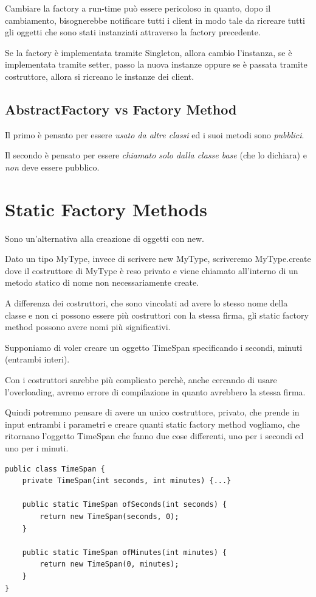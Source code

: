 Cambiare la factory a run-time può essere pericoloso in quanto, dopo il cambiamento, bisognerebbe notificare tutti i client in modo tale da ricreare tutti gli oggetti 
che sono stati instanziati attraverso la factory precedente.

Se la factory è implementata tramite Singleton, allora cambio l'instanza, se è implementata tramite setter, passo la nuova instanze oppure se è passata tramite 
costruttore, allora si ricreano le instanze dei client.

\subsection{AbstractFactory vs Factory Method}

Il primo è pensato per essere \textit{usato da altre classi} ed i suoi metodi sono \textit{pubblici}.

Il secondo è pensato per essere \textit{chiamato solo dalla classe base} (che lo dichiara) e \textit{non} deve essere pubblico.

\section{Static Factory Methods}

Sono un'alternativa alla creazione di oggetti con new.

Dato un tipo MyType, invece di scrivere new MyType, scriveremo MyType.create dove il costruttore di MyType è reso privato e viene chiamato all'interno di un metodo 
statico di nome non necessariamente create.

A differenza dei costruttori, che sono vincolati ad avere lo stesso nome della classe e non ci possono essere più costruttori con la stessa firma, gli static factory 
method possono avere nomi più significativi.

Supponiamo di voler creare un oggetto TimeSpan specificando i secondi, minuti (entrambi interi).

Con i costruttori sarebbe più complicato perchè, anche cercando di usare l'overloading, avremo errore di compilazione in quanto avrebbero la stessa firma.

Quindi potremmo pensare di avere un unico costruttore, privato, che prende in input entrambi i parametri e creare quanti static factory method vogliamo, che ritornano
l'oggetto TimeSpan che fanno due cose differenti, uno per i secondi ed uno per i minuti.

\begin{lstlisting}
public class TimeSpan {
    private TimeSpan(int seconds, int minutes) {...}

    public static TimeSpan ofSeconds(int seconds) {
        return new TimeSpan(seconds, 0);
    }

    public static TimeSpan ofMinutes(int minutes) {
        return new TimeSpan(0, minutes);
    }
}
\end{lstlisting}

